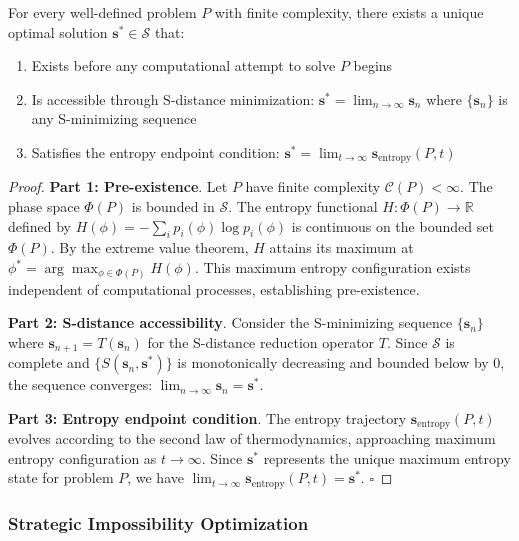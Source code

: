 \documentclass[11pt,a4paper]{article}
\begin{document}
\begin{theorem}
\label{thm:predetermined_solutions}
For every well-defined problem $P$ with finite complexity, there exists a unique optimal solution $\mathbf{s}^* \in \mathcal{S}$ that:
\begin{enumerate}
\item Exists before any computational attempt to solve $P$ begins
\item Is accessible through S-distance minimization: $\mathbf{s}^* = \lim_{n \to \infty} \mathbf{s}_n$ where $\{\mathbf{s}_n\}$ is any S-minimizing sequence
\item Satisfies the entropy endpoint condition: $\mathbf{s}^* = \lim_{t \to \infty} \mathbf{s}_{\text{entropy}}(P, t)$
\end{enumerate}
\end{theorem}

\begin{proof}
\textbf{Part 1: Pre-existence}. Let $P$ have finite complexity $\mathcal{C}(P) < \infty$. The phase space $\Phi(P)$ is bounded in $\mathcal{S}$. The entropy functional $H: \Phi(P) \to \mathbb{R}$ defined by $H(\phi) = -\sum_{i} p_i(\phi) \log p_i(\phi)$ is continuous on the bounded set $\Phi(P)$. By the extreme value theorem, $H$ attains its maximum at $\phi^* = \arg\max_{\phi \in \Phi(P)} H(\phi)$. This maximum entropy configuration exists independent of computational processes, establishing pre-existence.

\textbf{Part 2: S-distance accessibility}. Consider the S-minimizing sequence $\{\mathbf{s}_n\}$ where $\mathbf{s}_{n+1} = T(\mathbf{s}_n)$ for the S-distance reduction operator $T$. Since $\mathcal{S}$ is complete and $\{S(\mathbf{s}_n, \mathbf{s}^*)\}$ is monotonically decreasing and bounded below by 0, the sequence converges: $\lim_{n \to \infty} \mathbf{s}_n = \mathbf{s}^*$.

\textbf{Part 3: Entropy endpoint condition}. The entropy trajectory $\mathbf{s}_{\text{entropy}}(P, t)$ evolves according to the second law of thermodynamics, approaching maximum entropy configuration as $t \to \infty$. Since $\mathbf{s}^*$ represents the unique maximum entropy state for problem $P$, we have $\lim_{t \to \infty} \mathbf{s}_{\text{entropy}}(P, t) = \mathbf{s}^*$. $\square$
\end{proof}

\subsubsection{Strategic Impossibility Optimization}
\end{document}
